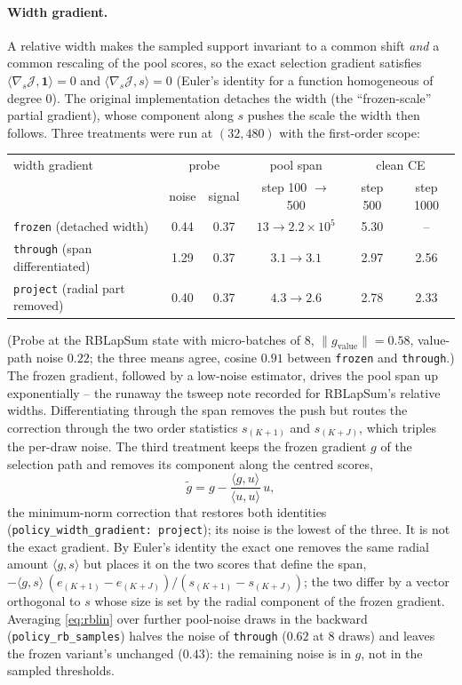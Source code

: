 \documentclass[11pt,a4paper]{article}
\newcommand{\code}[1]{\texttt{#1}}
\begin{document}
\paragraph{Width gradient.}
A relative width makes the sampled support invariant to a common shift
\emph{and} a common rescaling of the pool scores, so the exact selection
gradient satisfies $\langle \nabla_s \mathcal J, \mathbf 1 \rangle = 0$ and
$\langle \nabla_s \mathcal J, s \rangle = 0$ (Euler's identity for a function
homogeneous of degree 0). The original implementation detaches the width (the
``frozen-scale'' partial gradient), whose component along $s$ pushes the scale
the width then follows. Three treatments were run at $(32, 480)$ with the
first-order scope:

\begin{center}\small
\begin{tabular}{lccccc}
\toprule
width gradient & \multicolumn{2}{c}{probe} & pool span & \multicolumn{2}{c}{clean CE} \\
 & noise & signal & step 100 $\to$ 500 & step 500 & step 1000 \\
\midrule
\code{frozen} (detached width)      & 0.44 & 0.37 & $13 \to 2.2\times10^5$ & 5.30 & -- \\
\code{through} (span differentiated) & 1.29 & 0.37 & $3.1 \to 3.1$ & 2.97 & 2.56 \\
\code{project} (radial part removed) & 0.40 & 0.37 & $4.3 \to 2.6$ & 2.78 & 2.33 \\
\bottomrule
\end{tabular}
\end{center}

(Probe at the RBLapSum state with micro-batches of 8, $\|g_{\mathrm{value}}\| =
0.58$, value-path noise $0.22$; the three means agree, cosine $0.91$ between
\code{frozen} and \code{through}.) The frozen gradient, followed by a low-noise
estimator, drives the pool span up exponentially -- the runaway the tsweep note
recorded for RBLapSum's relative widths. Differentiating through the span
removes the push but routes the correction through the two order statistics
$s_{(K+1)}$ and $s_{(K+J)}$, which triples the per-draw noise. The third
treatment keeps the frozen gradient $g$ of the selection path and removes its
component along the centred scores,
\begin{equation}
\tilde g = g - \frac{\langle g, u \rangle}{\langle u, u \rangle}\,u,
\label{eq:project}
\end{equation}
the minimum-norm correction that restores both identities
(\code{policy\_width\_gradient: project}); its noise is the lowest of the three.
It is not the exact gradient. By Euler's identity the exact one removes the same
radial amount $\langle g, s \rangle$ but places it on the two scores that define
the span, $-\langle g, s\rangle\,(e_{(K+1)} - e_{(K+J)}) / (s_{(K+1)} - s_{(K+J)})$;
the two differ by a vector orthogonal to $s$ whose size is set by the radial
component of the frozen gradient.
Averaging \eqref{eq:rblin} over further pool-noise draws in the backward
(\code{policy\_rb\_samples}) halves the noise of \code{through} ($0.62$ at 8
draws) and leaves the frozen variant's unchanged ($0.43$): the remaining noise
is in $g$, not in the sampled thresholds.
\end{document}
